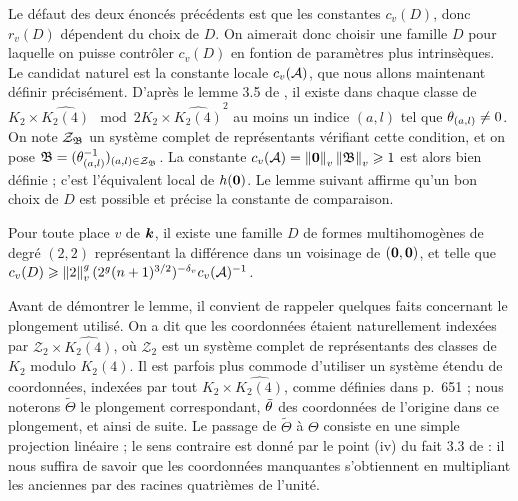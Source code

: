 Le défaut des deux énoncés précédents est que les constantes $c_v(D)$, donc
$r_v(D)$ dépendent  du choix de $D$. On aimerait donc choisir une
famille $D$ pour laquelle on puisse contrôler $c_v(D)$ en fontion de paramètres
plus intrinsèques. Le candidat naturel est la constante locale $c_v(\mathcal{A})$, que
nous allons maintenant définir précisément. D'après le lemme 3.5 de
\cite{daphiminvaii}, il existe dans chaque classe de $K_2 \times
\widehat{K_2(4)} \mod 2K_2 \times \widehat{K_2(4)}^2$ au moins un indice $(a,
l)$ tel que $\theta_{(a,l)} \neq 0$. On note $\mathcal{Z}_{\mathfrak{B}}$ un système complet
de représentants vérifiant cette condition, et on pose $\mathfrak{B} = (\theta_{(a,
l)}^{-1})_{(a, l) \in \mathcal{Z}_{\mathfrak{B}}}$. La constante $c_v(\mathcal{A}) =
\left\lVert{\boldsymbol{0}}\right\rVert_{v}\left\lVert\mathfrak{B}\right\rVert_{v} \geqslant 1$ est alors bien définie ; c'est l'équivalent local de
$h({\boldsymbol{0}})$. Le lemme suivant affirme qu'un bon choix de $D$ est possible et
précise la constante de comparaison.

\begin{lem} \label{RayonAbs}
  Pour toute place $v$ de $\boldsymbol{k}$, il existe une famille $D$ de formes
  multihomogènes de degré $(2, 2)$ représentant la différence dans un
  voisinage de $({\boldsymbol{0}}, {\boldsymbol{0}})$, et telle que $c_v(D) \geqslant
  \left\lVert2\right\rVert_{v}^g(2^g(n+1)^{3/2})^{-{\delta_v}} c_v(\mathcal{A})^{-1}$.
\end{lem}

Avant de démontrer le lemme, il convient de rappeler quelques faits concernant
le plongement utilisé. On a dit que les coordonnées étaient naturellement
indexées par $\mathcal{Z}_2 \times \widehat{K_2(4)}$, où $\mathcal{Z}_2$ est
un système complet de représentants des classes de $K_2$ modulo $K_2(4)$. Il
est parfois plus commode d'utiliser un système étendu de coordonnées, indexées
par tout $K_2 \times \widehat{K_2(4)}$, comme définies dans
\cite{daphiminvaii} p.~651 ; nous noterons $\tilde{\Theta}$ le plongement
correspondant, $\tilde{\theta}$ des coordonnées de l'origine dans ce plongement,
et ainsi de suite. Le passage de $\tilde{\Theta}$ à $\Theta$ consiste en une
simple projection linéaire ; le sens contraire est donné par le point (iv) du
fait 3.3 de  : il nous suffira de savoir que les coordonnées
manquantes s'obtiennent en multipliant les anciennes par des racines
quatrièmes de l'unité.

